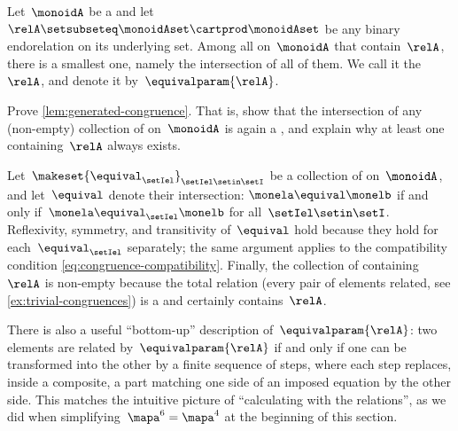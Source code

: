 \begin{lemma}
    \label{lem:generated-congruence}
    Let~$\monoidA$ be a  and let~$\relA \setsubseteq \monoidAset \cartprod \monoidAset$ be any binary endorelation on its underlying set.
    Among all  on~$\monoidA$ that contain~$\relA$, there is a smallest one, namely the intersection of all of them.
    We call it the ~$\relA$, and denote it by~$\equivalparam{\relA}$.
\end{lemma}

\begin{exercise}
    \label{ex:generated-congruence}
    Prove \cref{lem:generated-congruence}.
    That is, show that the intersection of any (non-empty) collection of  on~$\monoidA$ is again a , and explain why at least one  containing~$\relA$ always exists.
\end{exercise}
\begin{solution}
    Let~$\makeset{\equival_\setIel}_{\setIel \setin \setI}$ be a collection of  on~$\monoidA$, and let~$\equival$ denote their intersection: $\monela \equival \monelb$ if and only if~$\monela \equival_\setIel \monelb$ for all~$\setIel \setin \setI$.
    Reflexivity, symmetry, and transitivity of~$\equival$ hold because they hold for each~$\equival_\setIel$ separately; the same argument applies to the compatibility condition \cref{eq:congruence-compatibility}.
    Finally, the collection of  containing~$\relA$ is non-empty because the total relation (every pair of elements related, see \cref{ex:trivial-congruences}) is a  and certainly contains~$\relA$.
\end{solution}

\begin{remark}
    There is also a useful ``bottom-up'' description of~$\equivalparam{\relA}$: two elements are related by~$\equivalparam{\relA}$ if and only if one can be transformed into the other by a finite sequence of steps, where each step replaces, inside a composite, a part matching one side of an imposed equation by the other side.
    This matches the intuitive picture of ``calculating with the relations'', as we did when simplifying~$\mapa^6 = \mapa^4$ at the beginning of this section.
\end{remark}


